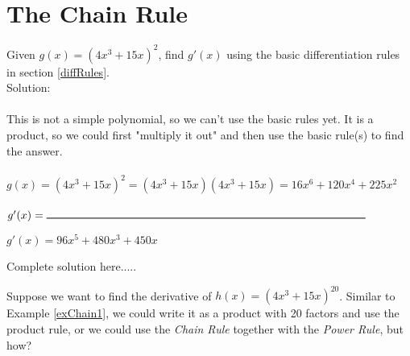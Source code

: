 \section*{The Chain Rule}
\begin{example}\label{exChain1}
Given $g(x)=(4x^3+15x)^2$, find $g'(x)$ using the basic differentiation rules in section \ref{diffRules}.\\

\noindent Solution:\\\\
This is not a simple polynomial, so we can’t use the basic rules yet. It is a product, so we could first "multiply it out" and then use the basic rule(s) to find the answer.\\\\
$g(x)=(4x^3+15x)^2=(4x^3+15x)(4x^3+15x)=16x^6+120x^4+225x^2$\\\\
\noindent $g'(x)=\rule{10cm}{0.25mm}$

    \begin{sol}
    $g'(x)=96x^5+480x^3+450x$
    \end{sol}
    \begin{solL}
    Complete solution here.....
    
    \end{solL}
    
\end{example}
\noindent Suppose we want to find the derivative of $h(x)=(4x^3+15x)^{20}$. Similar to Example \ref{exChain1}, we could write it as a product with 20 factors and use the product rule, or we could use the \emph{Chain Rule} together with the \emph{Power Rule}, but how?\\


